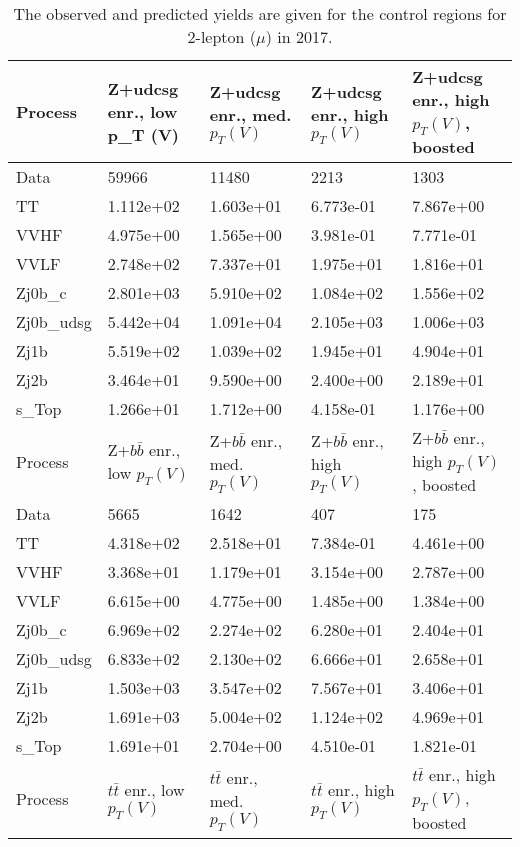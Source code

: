 \begin{table}
\centering
\caption[2017 2-lepton ($\mu$) control region yields]{
                  The observed and predicted yields are given for the
                  control regions for 2-lepton ($\mu$) in 2017.
                  }
{\footnotesize
\begin{tabularx}{\textwidth}{|X|X|X|X|X|}
\hline
Process & Z+udcsg enr., low p_{T} (V) & Z+udcsg enr., med. $p_{T}(V)$ & Z+udcsg enr., high $p_{T}(V)$ & Z+udcsg enr., high $p_{T}(V)$, boosted \\
\hline
Data & 59966 & 11480 & 2213 & 1303 \\
\hline
TT & 1.112e+02 & 1.603e+01 & 6.773e-01 & 7.867e+00 \\
VVHF & 4.975e+00 & 1.565e+00 & 3.981e-01 & 7.771e-01 \\
VVLF & 2.748e+02 & 7.337e+01 & 1.975e+01 & 1.816e+01 \\
Zj0b\_c & 2.801e+03 & 5.910e+02 & 1.084e+02 & 1.556e+02 \\
Zj0b\_udsg & 5.442e+04 & 1.091e+04 & 2.105e+03 & 1.006e+03 \\
Zj1b & 5.519e+02 & 1.039e+02 & 1.945e+01 & 4.904e+01 \\
Zj2b & 3.464e+01 & 9.590e+00 & 2.400e+00 & 2.189e+01 \\
s\_Top & 1.266e+01 & 1.712e+00 & 4.158e-01 & 1.176e+00 \\
\hline
\hline
Process & Z+$b\bar{b}$ enr., low $p_{T}(V)$ & Z+$b\bar{b}$ enr., med. $p_{T}(V)$ & Z+$b\bar{b}$ enr., high $p_{T}(V)$ & Z+$b\bar{b}$ enr., high $p_{T}(V)$, boosted \\
\hline
Data & 5665 & 1642 & 407 & 175 \\
\hline
TT & 4.318e+02 & 2.518e+01 & 7.384e-01 & 4.461e+00 \\
VVHF & 3.368e+01 & 1.179e+01 & 3.154e+00 & 2.787e+00 \\
VVLF & 6.615e+00 & 4.775e+00 & 1.485e+00 & 1.384e+00 \\
Zj0b\_c & 6.969e+02 & 2.274e+02 & 6.280e+01 & 2.404e+01 \\
Zj0b\_udsg & 6.833e+02 & 2.130e+02 & 6.666e+01 & 2.658e+01 \\
Zj1b & 1.503e+03 & 3.547e+02 & 7.567e+01 & 3.406e+01 \\
Zj2b & 1.691e+03 & 5.004e+02 & 1.124e+02 & 4.969e+01 \\
s\_Top & 1.691e+01 & 2.704e+00 & 4.510e-01 & 1.821e-01 \\
\hline
\hline
Process & $t\bar{t}$ enr., low $p_{T}(V)$ & $t\bar{t}$ enr., med. $p_{T}(V)$ & $t\bar{t}$ enr., high $p_{T}(V)$ & $t\bar{t}$ enr., high $p_{T}(V)$, boosted \\

\end{tabularx}}
\end{table}
